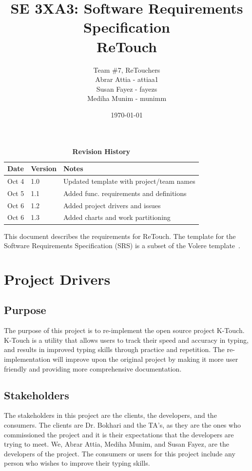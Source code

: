 \documentclass[12pt, titlepage]{article}
\title{SE 3XA3: Software Requirements Specification\\ReTouch}
\author{Team \#7, ReTouchers
		\\ Abrar Attia - attiaa1
		\\ Susan Fayez - fayezs
		\\ Mediha Munim - munimm
}
\date{\today}
\begin{document}
\maketitle

\tableofcontents
\listoftables
\listoffigures

\begin{table}[bp]
\caption{\bf Revision History}
\begin{tabularx}{\textwidth}{p{3cm}p{2cm}X}
\toprule {\bf Date} & {\bf Version} & {\bf Notes}\\
\midrule
Oct 4 & 1.0 & Updated template with project/team names\\
Oct 5 & 1.1 & Added func. requirements and definitions \\
Oct 6 & 1.2 & Added project drivers and issues\\
Oct 6 & 1.3 & Added charts and work partitioning\\
\bottomrule
\end{tabularx}
\end{table}

\newpage


This document describes the requirements for ReTouch.  The template for the Software
Requirements Specification (SRS) is a subset of the Volere
template~\citep{RobertsonAndRobertson2012}.

\section{Project Drivers}
\subsection{Purpose}
\indent \indent The purpose of this project is to re-implement the open source project K-Touch. K-Touch is a utility that allows users to track their speed and accuracy in typing, and results in improved typing skills through practice and repetition. The re-implementation will improve upon the original project by making it more user friendly and providing more comprehensive documentation.

\subsection{Stakeholders}
\indent \indent The stakeholders in this project are the clients, the developers, and the consumers. The clients are Dr. Bokhari and the TA's, as they are the ones who commissioned the project and it is their expectations that the developers are trying to meet. We, Abrar Attia, Mediha Munim, and Susan Fayez, are the developers of the project. The consumers or users for this project include any person who wishes to improve their typing skills.
\end{document}
